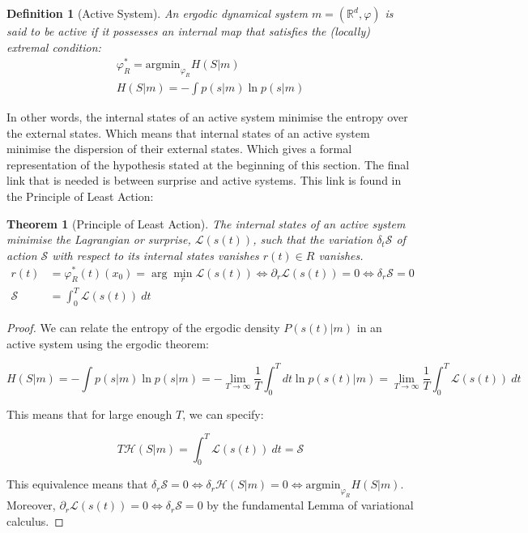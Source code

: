 \documentclass{article}
\newcommand{\R}{\mathbb{R}}
\newtheorem{theorem}{Theorem}
\newtheorem{definition}{Definition}
\begin{document}
\begin{definition}[Active System]\label{def:active_system}
	An ergodic dynamical system $m = (\R^d, \varphi)$ is said to be active if it possesses an internal map that satisfies the (locally) extremal condition:
	\begin{equation*}
	\begin{aligned}
		\varphi_R^*= \text{argmin}_{\varphi_R} H(S | m) \\
		H(S | m) = - \int p(s | m)\ln p(s | m)
	\end{aligned}
	\end{equation*}
\end{definition}

In other words, the internal states of an active system minimise the entropy over the external states. Which means that internal states of an active system minimise the dispersion of their external states. Which gives a formal representation of the hypothesis stated at the beginning of this section. The final link that is needed is between surprise and active systems. This link is found in the Principle of Least Action:

\begin{theorem}[Principle of Least Action]\label{theorem:principle_of_least_action}
The internal states of an active system minimise the Lagrangian or surprise, $\mathcal{L}(s(t))$, such that the variation $\delta_t \mathcal{S}$ of action $\mathcal{S}$ with respect to its internal states vanishes $r(t) \in R$ vanishes.
$$
\begin{aligned}
r(t) & =\varphi_R^*(t)\left(x_0\right)=\arg \min _r \mathcal{L}(s(t)) \iff \partial_r \mathcal{L}(s(t))=0 \iff \delta_r \mathcal{S}=0 \\
\mathcal{S} & =\int_0^T \mathcal{L}(s(t)) \ dt
\end{aligned}
$$
\end{theorem}

\begin{proof}
	We can relate the entropy of the ergodic density $P(s(t) | m)$ in an active system using the ergodic theorem:
	
	$$
	H(S | m) = - \int p(s | m)\ln p(s | m) = - \lim_{T \to \infty} \frac{1}{T} \int_0^T dt \ln p(s(t) | m) = \lim_{T \to \infty} \frac{1}{T} \int_0^T \mathcal{L}(s(t)) \ dt
	$$
	
	This means that for large enough $T$, we can specify:
	
	$$
	T \mathcal{H}(S | m) = \int_0^T \mathcal{L}(s(t)) \ dt = \mathcal{S}
	$$
	
	This equivalence means that $\delta_r\mathcal{S} = 0 \iff \delta_r\mathcal{H}(S | m) = 0 \iff \text{argmin}_{\varphi_R} H(S | m)$. Moreover, $\partial_r \mathcal{L}(s(t)) = 0 \iff \delta_r \mathcal{S} = 0$ by the  fundamental Lemma of variational calculus.
\end{proof}
\end{document}
